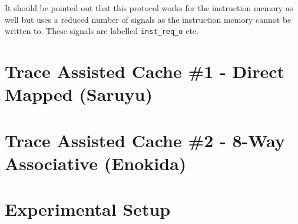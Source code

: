 \begin{figure}
\begin{subfigure}{\textwidth}
	\end{subfigure}
	\begin{subfigure}{\textwidth}
	\end{subfigure}
\end{figure}

It should be pointed out that this protocol works for the instruction memory as well but uses a reduced number of signals as the instruction memory cannot be written to. These signals are labelled \texttt{inst\_req\_o} etc.


\section{Trace Assisted Cache \#1 - Direct Mapped (Saruyu)}

\section{Trace Assisted Cache \#2 - 8-Way Associative (Enokida)}

\section{Experimental Setup}

